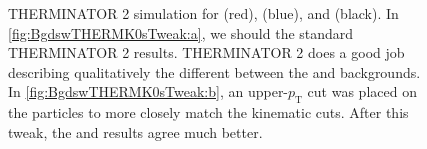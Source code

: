 \documentclass[../AnalysisNoteJBuxton.tex]{subfiles}
\begin{document}
\begin{figure}[h!]
  \centering
  \caption[Backgrounds with THERMINATOR, \Ks Tweak]{THERMINATOR 2 simulation for \LamKchP (red), \LamKchM (blue), and \LamKs (black).  In \ref{fig:BgdswTHERMK0sTweak:a}, we should the standard THERMINATOR 2 results.  THERMINATOR 2 does a good job describing qualitatively the different between the \LamKpm and \LamKs backgrounds.  In \ref{fig:BgdswTHERMK0sTweak:b}, an upper-$p_{\mathrm{T}}$ cut was placed on the \Ks particles to more closely match the \Kpm kinematic cuts.  After this tweak, the \LamKpm and \LamKs results agree much better.}
  \label{fig:BgdswTHERMK0sTweak}
\end{figure}
\end{document}
